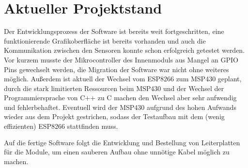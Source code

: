 \documentclass[a4paper,11pt]{article}
\begin{document}
\section{Aktueller Projektstand}

Der Entwicklungsprozess der Software ist bereits weit fortgeschritten, eine funktionierende Grafikoberfläche ist bereits vorhanden und auch die Kommunikation
zwischen den Sensoren konnte schon erfolgreich getestet werden. Vor kurzem musste der Mikrocontroller des Innenmoduls aus Mangel an GPIO Pins gewechselt werden,
die Migration der Software war nicht ohne weiteres möglich. Außerdem ist aktuell der Wechsel vom ESP8266 zum MSP430 geplant, durch die stark limitierten Ressourcen
beim MSP430 und der Wechsel der Programmiersprache von C++ zu C machen den Wechsel aber sehr aufwendig und fehlerbehaftet. Eventuell wird der MSP430 aufgrund des hohen
Aufwands wieder aus dem Projekt gestrichen, sodass der Testaufbau mit dem (wenig effizienten) ESP8266 stattfinden muss. 

\vspace{0.2cm}
\noindent
Auf die fertige Software folgt die Entwicklung und Bestellung von Leiterplatten für die Module, um einen sauberen Aufbau ohne unnötige Kabel möglich zu machen. 
\end{document}
